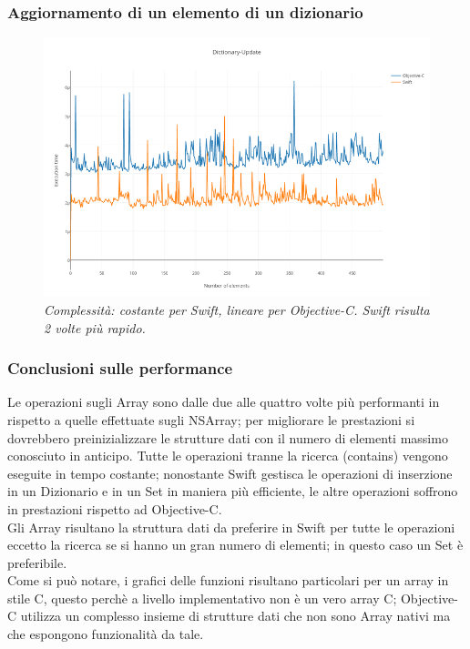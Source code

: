 \subsubsection{Aggiornamento di un elemento di un dizionario}
\begin{figure}[H]
      \centering
      \includegraphics[scale=0.50]{immagini/dictionary_update.png}
            \vspace{0.8cm}
            \caption{\textit{Complessità: costante per Swift, lineare per Objective-C. Swift risulta 2 volte più rapido.}}
\end{figure}
\subsubsection{Conclusioni sulle performance}
Le operazioni sugli Array sono dalle due alle quattro volte più performanti in rispetto a quelle effettuate sugli NSArray; per migliorare le prestazioni si dovrebbero preinizializzare le strutture dati con il numero di elementi massimo conosciuto in anticipo. Tutte le operazioni tranne la ricerca (contains) vengono eseguite in tempo costante; nonostante Swift gestisca le operazioni di inserzione in un Dizionario e in un Set in maniera più efficiente, le altre operazioni soffrono in prestazioni rispetto ad Objective-C.\\
Gli Array risultano la struttura dati da preferire in Swift per tutte le operazioni eccetto la ricerca se si hanno un gran numero di elementi; in questo caso un Set è preferibile.\\
Come si può notare, i grafici delle funzioni risultano particolari per un array in stile C, questo perchè a livello implementativo non è un vero array C; Objective-C utilizza un complesso insieme di strutture dati che non sono Array nativi ma che espongono funzionalità da tale.
    
    
    
    



